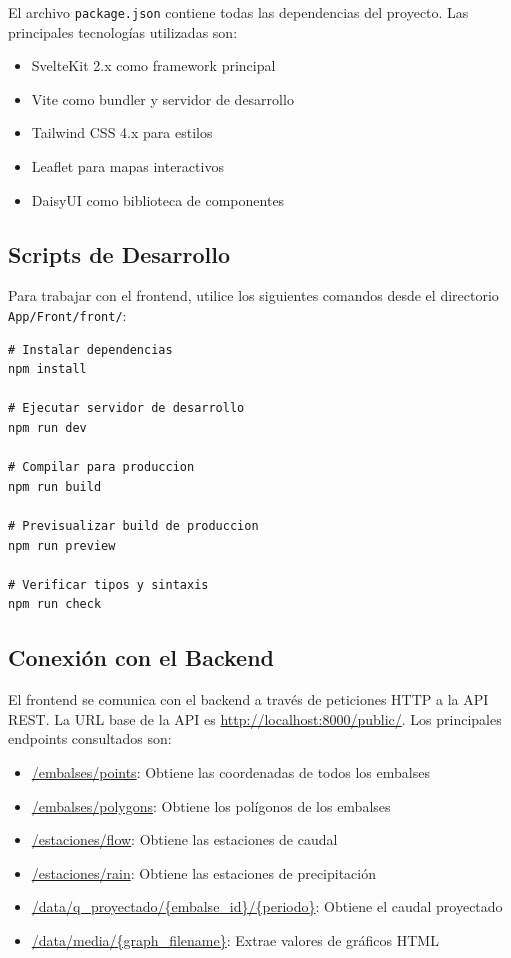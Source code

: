El archivo \texttt{package.json} contiene todas las dependencias del proyecto. Las principales tecnologías utilizadas son:

\begin{itemize}
    \item SvelteKit 2.x como framework principal
    \item Vite como bundler y servidor de desarrollo
    \item Tailwind CSS 4.x para estilos
    \item Leaflet para mapas interactivos
    \item DaisyUI como biblioteca de componentes
\end{itemize}

\subsection{Scripts de Desarrollo}

Para trabajar con el frontend, utilice los siguientes comandos desde el directorio \texttt{App/Front/front/}:

\begin{lstlisting}[style=bash]
# Instalar dependencias
npm install

# Ejecutar servidor de desarrollo
npm run dev

# Compilar para produccion
npm run build

# Previsualizar build de produccion
npm run preview

# Verificar tipos y sintaxis
npm run check
\end{lstlisting}

\subsection{Conexión con el Backend}

El frontend se comunica con el backend a través de peticiones HTTP a la API REST. La URL base de la API es \url{http://localhost:8000/public/}. Los principales endpoints consultados son:

\begin{itemize}
    \item \url{/embalses/points}: Obtiene las coordenadas de todos los embalses
    \item \url{/embalses/polygons}: Obtiene los polígonos de los embalses
    \item \url{/estaciones/flow}: Obtiene las estaciones de caudal
    \item \url{/estaciones/rain}: Obtiene las estaciones de precipitación
    \item \url{/data/q_proyectado/{embalse_id}/{periodo}}: Obtiene el caudal proyectado
    \item \url{/data/media/{graph_filename}}: Extrae valores de gráficos HTML
\end{itemize}

